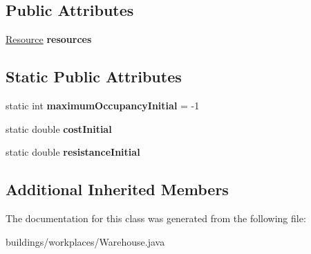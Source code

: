 \subsection*{Public Attributes}
\begin{DoxyCompactItemize}
\item 
\hyperlink{classuniverse_1_1_resource}{Resource} {\bfseries resources}\hypertarget{classbuildings_1_1workplaces_1_1_warehouse_a145f17b1d56049338e373a7f753a02fb}{}\label{classbuildings_1_1workplaces_1_1_warehouse_a145f17b1d56049338e373a7f753a02fb}

\end{DoxyCompactItemize}
\subsection*{Static Public Attributes}
\begin{DoxyCompactItemize}
\item 
static int {\bfseries maximum\+Occupancy\+Initial} = -\/1\hypertarget{classbuildings_1_1workplaces_1_1_warehouse_a05df693b69ad66fe69dabc46a9cb85bd}{}\label{classbuildings_1_1workplaces_1_1_warehouse_a05df693b69ad66fe69dabc46a9cb85bd}

\item 
static double {\bfseries cost\+Initial}\hypertarget{classbuildings_1_1workplaces_1_1_warehouse_aa816f51b120805146a5ebcebc72c475d}{}\label{classbuildings_1_1workplaces_1_1_warehouse_aa816f51b120805146a5ebcebc72c475d}

\item 
static double {\bfseries resistance\+Initial}\hypertarget{classbuildings_1_1workplaces_1_1_warehouse_adbc358e9bcab83302f566a03f190dacb}{}\label{classbuildings_1_1workplaces_1_1_warehouse_adbc358e9bcab83302f566a03f190dacb}

\end{DoxyCompactItemize}
\subsection*{Additional Inherited Members}


The documentation for this class was generated from the following file\+:\begin{DoxyCompactItemize}
\item 
buildings/workplaces/Warehouse.\+java\end{DoxyCompactItemize}
